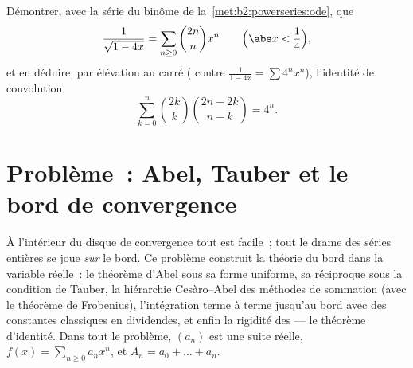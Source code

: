 \begin{exercise}[$\star\star\star$]\label{exo:b2:powerseries:12}
Démontrer, avec la série du binôme de
la~\cref{met:b2:powerseries:ode}, que
\[
\frac{1}{\sqrt{1 - 4x}} = \sum_{n\geq0}\binom{2n}{n}x^n
\qquad \Bigl(\abs x < \frac14\Bigr),
\]
et en déduire, par élévation au carré ( contre
$\frac{1}{1-4x} = \sum 4^nx^n$), l'identité de convolution
\[
\sum_{k=0}^{n}\binom{2k}{k}\binom{2n-2k}{n-k} = 4^n .
\]
\end{exercise}

\section{Problème~: Abel, Tauber et le bord de convergence}

\begin{problem}\label{pb:b2:powerseries:1}
À l'intérieur du disque de convergence tout est facile~; tout le
drame des séries entières se joue \emph{sur} le bord. Ce
problème construit la théorie du bord dans la variable réelle~: le
théorème d'Abel sous sa forme uniforme, sa réciproque sous la
condition de Tauber, la hiérarchie Cesàro--Abel des méthodes de
sommation (avec le théorème de Frobenius), l'intégration terme à
terme jusqu'au bord avec des constantes classiques en dividendes, et
enfin la rigidité des  --- le théorème
d'identité.
Dans tout le problème, $(a_n)$ est une suite réelle, $f(x) = \sum_{n\geq0}
a_nx^n$, et $A_n = a_0 + \dots + a_n$.


\end{problem}
